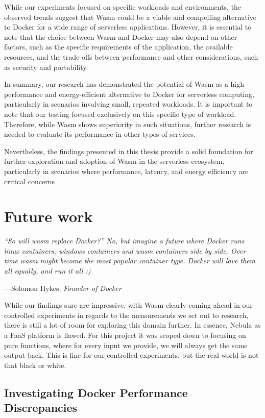 \documentclass[
  table]{report}
\begin{document}
While our experiments focused on specific workloads and environments,
the observed trends suggest that Wasm could be a viable and compelling
alternative to Docker for a wide range of serverless applications.
However, it is essential to note that the choice between Wasm and Docker
may also depend on other factors, such as the specific requirements of
the application, the available resources, and the trade-offs between
performance and other considerations, such as security and portability.

In summary, our research has demonstrated the potential of Wasm as a
high-performance and energy-efficient alternative to Docker for
serverless computing, particularly in scenarios involving small,
repeated workloads. It is important to note that our testing focused
exclusively on this specific type of workload. Therefore, while Wasm
shows superiority in such situations, further research is needed to
evaluate its performance in other types of services.

Nevertheless, the findings presented in this thesis provide a solid
foundation for further exploration and adoption of Wasm in the
serverless ecosystem, particularly in scenarios where performance,
latency, and energy efficiency are critical concerns

\newpage
\chapter{Future work}

\setlength{}

\epigraph{\itshape 
“So will wasm replace Docker?” No, but imagine a future where Docker runs linux
containers, windows containers and wasm containers side by side. Over time wasm
might become the most popular container type. Docker will love them all equally,
and run it all :)
}{---Solomon Hykes, \textit{Founder of Docker}}

While our findings sure are impressive, with \ac{Wasm} clearly coming
ahead in our controlled experiments in regards to the measurements we
set out to research, there is still a lot of room for exploring this
domain further. In essence, Nebula as a \ac{FaaS} platform is flawed.
For this project it was scoped down to focusing on pure functions, where
for every input we provide, we will always get the same output back.
This is fine for our controlled experiments, but the real world is not
that black or white.

\section{Investigating Docker Performance Discrepancies}
\end{document}
